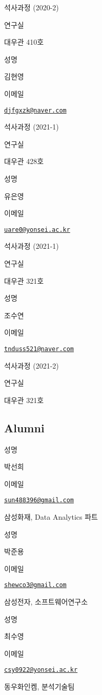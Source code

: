 \documentclass[
]{book}
\begin{document}
석사과정 (2020-2)

연구실

대우관 410호

성명

김현영

이메일

\href{mailto:djfgxzk@naver.com}{\nolinkurl{djfgxzk@naver.com}}

석사과정 (2021-1)

연구실

대우관 428호

성명

유은영

이메일

\href{mailto:uare0@yonsei.ac.kr}{\nolinkurl{uare0@yonsei.ac.kr}}

석사과정 (2021-1)

연구실

대우관 321호

성명

조수연

이메일

\href{mailto:tnduss521@naver.com}{\nolinkurl{tnduss521@naver.com}}

석사과정 (2021-2)

연구실

대우관 321호

\hypertarget{alumni}{%
\subsection*{Alumni}\label{alumni}}

성명

박선희

이메일

\href{mailto:sun488396@gmail.com}{\nolinkurl{sun488396@gmail.com}}

삼성화재, Data Analytics 파트

성명

박준용

이메일

\href{mailto:shewco3@gmail.com}{\nolinkurl{shewco3@gmail.com}}

삼성전자, 소프트웨어연구소

성명

최수영

이메일

\href{mailto:csy0922@yonsei.ac.kr}{\nolinkurl{csy0922@yonsei.ac.kr}}

동우화인켐, 분석기술팀
\end{document}
